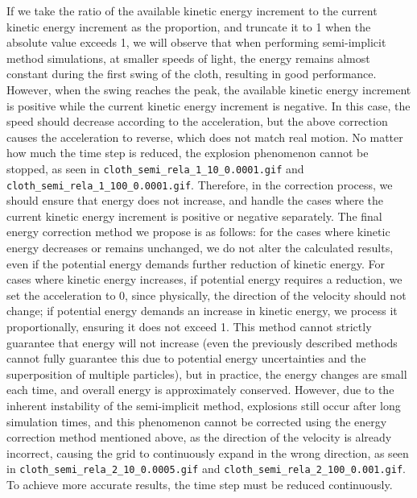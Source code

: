 \documentclass{article}
\begin{document}
If we take the ratio of the available kinetic energy increment to the current kinetic energy increment as the proportion, and truncate it to 1 when the absolute value exceeds 1, we will observe that when performing semi-implicit method simulations, at smaller speeds of light, the energy remains almost constant during the first swing of the cloth, resulting in good performance. However, when the swing reaches the peak, the available kinetic energy increment is positive while the current kinetic energy increment is negative. In this case, the speed should decrease according to the acceleration, but the above correction causes the acceleration to reverse, which does not match real motion. No matter how much the time step is reduced, the explosion phenomenon cannot be stopped, as seen in \lstinline|cloth_semi_rela_1_10_0.0001.gif| and \lstinline|cloth_semi_rela_1_100_0.0001.gif|. Therefore, in the correction process, we should ensure that energy does not increase, and handle the cases where the current kinetic energy increment is positive or negative separately. The final energy correction method we propose is as follows: for the cases where kinetic energy decreases or remains unchanged, we do not alter the calculated results, even if the potential energy demands further reduction of kinetic energy. For cases where kinetic energy increases, if potential energy requires a reduction, we set the acceleration to 0, since physically, the direction of the velocity should not change; if potential energy demands an increase in kinetic energy, we process it proportionally, ensuring it does not exceed 1. This method cannot strictly guarantee that energy will not increase (even the previously described methods cannot fully guarantee this due to potential energy uncertainties and the superposition of multiple particles), but in practice, the energy changes are small each time, and overall energy is approximately conserved. However, due to the inherent instability of the semi-implicit method, explosions still occur after long simulation times, and this phenomenon cannot be corrected using the energy correction method mentioned above, as the direction of the velocity is already incorrect, causing the grid to continuously expand in the wrong direction, as seen in \lstinline|cloth_semi_rela_2_10_0.0005.gif| and \lstinline|cloth_semi_rela_2_100_0.001.gif|. To achieve more accurate results, the time step must be reduced continuously.
\end{document}
